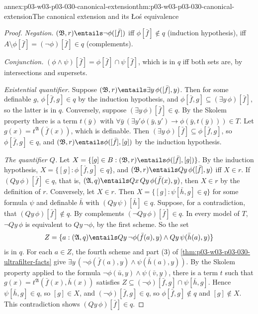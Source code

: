 \begin{annexitem}{annex:p03-w03-p03-030-canonical-extension}{thm:p03-w03-p03-030-canonical-extension}{The canonical extension and its \L o\'s equivalence}
\begin{proof}
\emph{Negation.}  \((\mathfrak B,r)\entails\neg\phi([\bar f])\) iff
\(\phi[\bar f]\notin q\) (induction hypothesis), iff
\(A\setminus\phi[\bar f]=(\neg\phi)[\bar f]\in q\) (complements).

\emph{Conjunction.}  \((\phi\wedge\psi)[\bar f]=\phi[\bar f]\cap\psi[\bar
f]\), which is in \(q\) iff both sets are, by intersections and supersets.

\emph{Existential quantifier.}  Suppose \((\mathfrak B,r)\entails\exists
y\,\phi([\bar f],y)\).  Then for some definable \(g\),
\(\phi[\bar f,g]\in q\) by the induction hypothesis, and
\(\phi[\bar f,g]\subseteq(\exists y\,\phi)[\bar f]\), so the latter is in
\(q\).  Conversely, suppose \((\exists y\,\phi)[\bar f]\in q\).  By the Skolem
property there is a term \(t(\bar y)\) with
\(\forall\bar y\,(\exists y'\phi(\bar y,y')\rightarrow\phi(\bar
y,t(\bar y)))\in T\).  Let \(g(x)=t^{\mathfrak A}(\bar f(x))\), which is
definable.  Then \((\exists y\,\phi)[\bar f]\subseteq\phi[\bar f,g]\), so
\(\phi[\bar f,g]\in q\), and \((\mathfrak B,r)\entails\phi([\bar f],[g])\) by
the induction hypothesis.

\emph{The quantifier \(Q\).}  Let \(X=\{[g]\in B:(\mathfrak B,r)\entails
\phi([\bar f],[g])\}\).  By the induction hypothesis,
\(X=\{[g]:\phi[\bar f,g]\in q\}\), and \((\mathfrak B,r)\entails
Qy\,\phi([\bar f],y)\) iff \(X\in r\).  If \((Qy\,\phi)[\bar f]\in q\), that
is, \((\mathfrak A,q)\entails Qx\,Qy\,\phi(\bar f(x),y)\), then \(X\in r\) by
the definition of \(r\).  Conversely, let \(X\in r\).  Then
\(X=\{[g]:\psi[\bar h,g]\in q\}\) for some formula \(\psi\) and definable
\(\bar h\) with \((Qy\,\psi)[\bar h]\in q\).  Suppose, for a contradiction,
that \((Qy\,\phi)[\bar f]\notin q\).  By complements
\((\neg Qy\,\phi)[\bar f]\in q\).  In every model of \(T\),
\(\neg Qy\,\phi\) is equivalent to \(Qy\,\neg\phi\), by the first scheme.
So the set
\[
 Z=\{a:(\mathfrak A,q)\entails Qy\,\neg\phi(\bar f(a),y)\wedge
                              Qy\,\psi(\bar h(a),y)\}
\]
is in \(q\).  For each \(a\in Z\), the fourth scheme and part (3) of
\cref{thm:p03-w03-p03-030-ultrafilter-facts} give
\(\exists y\,(\neg\phi(\bar f(a),y)\wedge\psi(\bar h(a),y))\).  By the Skolem
property applied to the formula \(\neg\phi(\bar u,y)\wedge\psi(\bar v,y)\),
there is a term \(t\) such that \(g(x)=t^{\mathfrak A}(\bar f(x),\bar h(x))\)
satisfies \(Z\subseteq(\neg\phi)[\bar f,g]\cap\psi[\bar h,g]\).  Hence
\(\psi[\bar h,g]\in q\), so \([g]\in X\), and \((\neg\phi)[\bar f,g]\in q\), so
\(\phi[\bar f,g]\notin q\) and \([g]\notin X\).  This contradiction shows
\((Qy\,\phi)[\bar f]\in q\).


\end{proof}
\end{annexitem}
